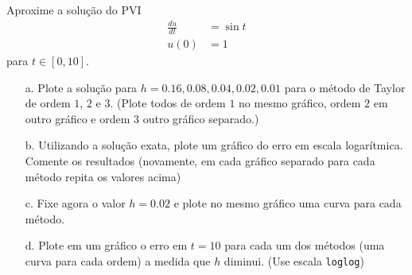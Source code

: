

\begin{ex}
Aproxime a solução do PVI
\begin{eqnarray}
   \frac{du}{dt} &=\sin{t}\\
            u(0) &= 1
\end{eqnarray}
para  $t\in [0,10]$.

\begin{enumerate}
\item [a.] Plote a solução para $h=0.16,0.08, 0.04, 0.02, 0.01$ para o método de Taylor de ordem $1$, $2$ e $3$. (Plote todos de ordem $1$ no mesmo gráfico, ordem $2$ em outro gráfico e ordem $3$ outro gráfico separado.)

\item [b.] Utilizando a solução exata, plote um gráfico do erro em escala logar\'itmica.
Comente os resultados (novamente, em cada gráfico separado para cada método repita os valores acima)

\item [c.] Fixe agora o valor $h=0.02$ e plote no mesmo gráfico uma curva para cada método.

\item [d.] Plote em um gráfico o erro em $t=10$ para cada um dos métodos (uma curva para cada ordem) a medida que $h$ diminui. (Use escala \verb#loglog#)
\end{enumerate}
\end{ex}











